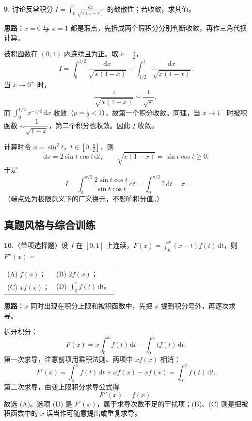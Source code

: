 \else \answerarea[10] \fi%

\textbf{9.} 讨论反常积分 $\displaystyle I=\int_{0}^{1}\frac{\mathrm dx}{\sqrt{x(1-x)}}$ 的敛散性；若收敛，求其值。

\ifshowsolutions%
\textbf{思路：}$x=0$ 与 $x=1$ 都是瑕点，先拆成两个瑕积分分别判断收敛，再作三角代换计算。

被积函数在 $(0,1)$ 内连续且为正。取 $c=\frac12$，
\[
  I=\int_0^{1/2}\frac{\mathrm dx}{\sqrt{x(1-x)}}+\int_{1/2}^{1}\frac{\mathrm dx}{\sqrt{x(1-x)}}.
\]
当 $x\to0^+$ 时，
\[
  \frac{1}{\sqrt{x(1-x)}}\sim\frac{1}{\sqrt x},
\]
而 $\int_0^{1/2}x^{-1/2}\,\mathrm dx$ 收敛（$p=\frac12<1$），故第一个积分收敛。同理，当 $x\to1^-$ 时被积函数 $\sim\dfrac{1}{\sqrt{1-x}}$，第二个积分也收敛。因此 $I$ 收敛。

计算时令 $x=\sin^2t$，$t\in\left[0,\frac{\pi}{2}\right]$，则
\[
  \mathrm dx=2\sin t\cos t\,\mathrm dt,\qquad
  \sqrt{x(1-x)}=\sin t\cos t\ge0.
\]
于是
\[
  I=\int_0^{\pi/2}\frac{2\sin t\cos t}{\sin t\cos t}\,\mathrm dt
   =\int_0^{\pi/2}2\,\mathrm dt=\pi.
\]
（端点处为极限意义下的广义换元，不影响积分值。）

\else \answerarea[10] \fi%

\subsection{真题风格与综合训练}

\textbf{10.}（单项选择题）设 $f$ 在 $[0,1]$ 上连续，$F(x)=\displaystyle\int_0^x (x-t)f(t)\,\mathrm dt$，则 $F''(x)=$

\begin{center}
\begin{tabular}{ll}
(A) $f(x)$； & (B) $2f(x)$；\\[4pt]
(C) $xf(x)$； & (D) $\displaystyle\int_0^x f(t)\,\mathrm dt$。
\end{tabular}
\end{center}

\ifshowsolutions%
\textbf{思路：}$x$ 同时出现在积分上限和被积函数中，先把 $x$ 提到积分号外，再逐次求导。

拆开积分：
\[
  F(x)=x\int_0^x f(t)\,\mathrm dt-\int_0^x t f(t)\,\mathrm dt.
\]
第一次求导，注意前项用乘积法则、两项中 $x f(x)$ 相消：
\[
  F'(x)=\int_0^x f(t)\,\mathrm dt+x f(x)-x f(x)=\int_0^x f(t)\,\mathrm dt.
\]
第二次求导，由变上限积分求导公式得
\[
  F''(x)=f(x).
\]
故选 (A)。选项 (D) 是 $F'(x)$，属于求导次数不足的干扰项；(B)、(C) 则是把被积函数中的 $x$ 误当作可随意提出或重复求导。

